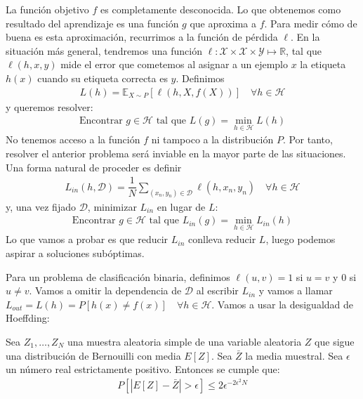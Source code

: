 La función objetivo $f$ es completamente desconocida. Lo que obtenemos como resultado del aprendizaje es una función $g$ que aproxima a $f$. Para medir cómo de buena es esta aproximación, recurrimos a la función de pérdida $\ell$.
En la situación más general, tendremos una función $\ell: \mathcal{X} \times \mathcal{X} \times \mathcal{Y} \mapsto \mathbb{R}$, tal que $\ell(h, x, y)$ mide el error que cometemos al asignar a un ejemplo $x$ la etiqueta $h(x)$ cuando su etiqueta correcta es $y$. Definimos 
\begin{gather*}
	L(h) = \mathbb{E}_{X \sim P}[\ell(h, X, f(X))] \quad \forall h \in \mathcal{H}
\end{gather*}
y queremos resolver:
\begin{gather*}
	\text{Encontrar $g \in \mathcal{H}$ tal que } L(g) = \min_{h \in \mathcal{H}} L(h)
\end{gather*}
No tenemos acceso a la función $f$ ni tampoco a la distribución $P$. Por tanto, resolver el anterior problema será inviable en la mayor parte de las situaciones. Una forma natural de proceder es definir 
\begin{gather*}
	L_{in}(h, \mathcal{D}) =  \dfrac{1}{N}\sum_{(x_n, y_n) \in \mathcal{D}} \ell(h, x_n, y_n) \quad  \forall h \in \mathcal{H}
\end{gather*}
y, una vez fijado $\mathcal{D}$, minimizar $L_{in}$ en lugar de $L$:
\begin{gather*}
	\text{Encontrar $g \in \mathcal{H}$ tal que } L_{in}(g) = \min_{h \in \mathcal{H}} L_{in}(h)
\end{gather*}
Lo que vamos a probar es que reducir $L_{in}$ conlleva reducir $L$, luego podemos aspirar a soluciones subóptimas.

Para un problema de clasificación binaria, definimos $\ell(u,v)=1$ si $u=v$ y $0$ si $u\neq v$. Vamos a omitir la dependencia de $\mathcal{D}$ al escribir $L_{in}$ y vamos a llamar $L_{out} = L(h) = P[h(x) \neq f(x)] \quad \forall h \in \mathcal{H}$. Vamos a usar la desigualdad de Hoeffding:

\begin{lemma}\label{hoeffding}
	Sea $Z_1, \ldots, Z_N$ una muestra aleatoria simple de una variable aleatoria $Z$ que sigue una distribución de Bernouilli con media $E[Z]$. Sea $\bar{Z}$ la media muestral. Sea $\epsilon$ un número real estrictamente positivo. Entonces se cumple que:
	\begin{align}
		P[ |E[Z] - \bar{Z}| > \epsilon  ] \leq 2 \epsilon^{-2 \epsilon^2 N}
	\end{align}
\end{lemma}


